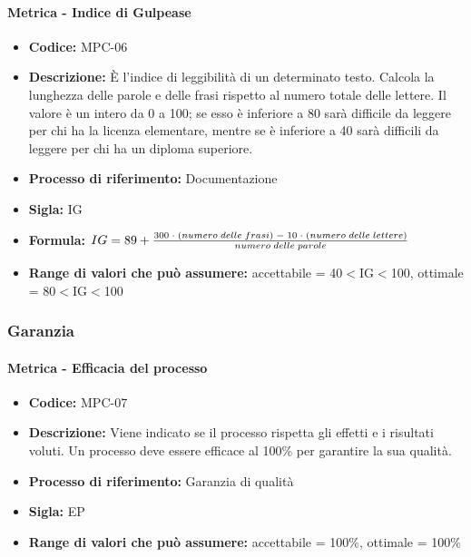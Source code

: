     \paragraph{Metrica - Indice di Gulpease}
    \begin{itemize}
        \item \textbf{Codice:} MPC-06
        \item \textbf{Descrizione:} È l'indice di leggibilità di un determinato testo. Calcola la lunghezza delle parole e delle frasi rispetto al numero totale delle lettere. Il valore è un intero da 0 a 100; se esso è inferiore a 80 sarà difficile da leggere per chi ha la licenza elementare, mentre se è inferiore a 40 sarà difficili da leggere per chi ha un diploma superiore.
        \item \textbf{Processo di riferimento:} Documentazione
        \item \textbf{Sigla:} IG
        \item \textbf{Formula:} \begin{math}{IG = 89 + {{300 \; \cdot \; (numero\; delle \; frasi) \; - \; 10 \; \cdot \; (numero \; delle \; lettere)}\over numero \; delle \; parole}}\end{math}
        \item \textbf{Range di valori che può assumere:} accettabile = 40$<$IG$<$100, ottimale = 80$<$IG$<$100
    \end{itemize}

\subsubsection{Garanzia}
    \paragraph{Metrica - Efficacia del processo}
    \begin{itemize}
        \item \textbf{Codice:} MPC-07
        \item \textbf{Descrizione:} Viene indicato se il processo rispetta gli effetti e i risultati voluti. Un processo deve essere efficace al 100\% per garantire la sua qualità.
        \item \textbf{Processo di riferimento:} Garanzia di qualità
        \item \textbf{Sigla:} EP
        \item \textbf{Range di valori che può assumere:} accettabile = 100\%, ottimale = 100\%
    \end{itemize}

